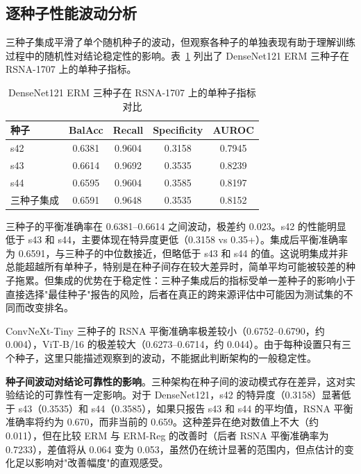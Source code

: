 \documentclass[12pt,a4paper,UTF8,openany]{ctexbook}
\begin{document}
\subsection{逐种子性能波动分析}

三种子集成平滑了单个随机种子的波动，但观察各种子的单独表现有助于理解训练过程中的随机性对结论稳定性的影响。表~\ref{tab:per_seed_rsna} 列出了 DenseNet121 ERM 三种子在 RSNA-1707 上的单种子指标。

\begin{table}[htbp]
\centering
\caption{DenseNet121 ERM 三种子在 RSNA-1707 上的单种子指标对比}
\label{tab:per_seed_rsna}
\renewcommand{\arraystretch}{1.25}
\begin{tabular}{lcccc}
\toprule
\textbf{种子} & \textbf{BalAcc} & \textbf{Recall} & \textbf{Specificity} & \textbf{AUROC} \\
\midrule
s42 & 0.6381 & 0.9604 & 0.3158 & 0.7945 \\
s43 & 0.6614 & 0.9692 & 0.3535 & 0.8239 \\
s44 & 0.6595 & 0.9604 & 0.3585 & 0.8197 \\
\midrule
三种子集成 & 0.6591 & 0.9648 & 0.3535 & 0.8152 \\
\bottomrule
\end{tabular}
\end{table}

三种子的平衡准确率在 0.6381--0.6614 之间波动，极差约 0.023。s42 的性能明显低于 s43 和 s44，主要体现在特异度更低（0.3158 vs 0.35+）。集成后平衡准确率为 0.6591，与三种子的中位数接近，但略低于 s43 和 s44 的值。这说明集成并非总能超越所有单种子，特别是在种子间存在较大差异时，简单平均可能被较差的种子拖累。但集成的优势在于稳定性：三种子集成后的指标受单一差种子的影响小于直接选择"最佳种子"报告的风险，后者在真正的跨来源评估中可能因为测试集的不同而改变排名。

ConvNeXt-Tiny 三种子的 RSNA 平衡准确率极差较小（0.6752--0.6790，约 0.004），ViT-B/16 的极差较大（0.6273--0.6714，约 0.044）。由于每种设置只有三个种子，这里只能描述观察到的波动，不能据此判断架构的一般稳定性。

\textbf{种子间波动对结论可靠性的影响}。三种架构在种子间的波动模式存在差异，这对实验结论的可靠性有一定影响。对于 DenseNet121，s42 的特异度（0.3158）显著低于 s43（0.3535）和 s44（0.3585），如果只报告 s43 和 s44 的平均值，RSNA 平衡准确率将约为 0.670，而非当前的 0.659。这种差异在绝对数值上不大（约 0.011），但在比较 ERM 与 ERM-Reg 的改善时（后者 RSNA 平衡准确率为 0.7233），差值将从 0.064 变为 0.053，虽然仍在统计显著的范围内，但点估计的变化足以影响对"改善幅度"的直观感受。
\end{document}
